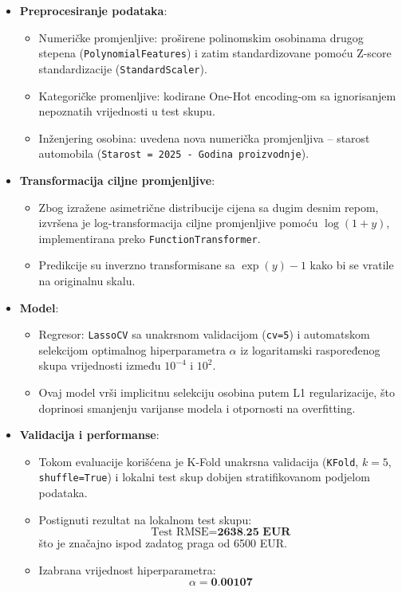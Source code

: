 \documentclass[a4paper,12pt]{article}
\begin{document}
\begin{itemize}
    \item \textbf{Preprocesiranje podataka}:
    \begin{itemize}
        \item Numeričke promjenljive: proširene polinomskim osobinama drugog stepena (\texttt{PolynomialFeatures}) i zatim standardizovane pomoću Z-score standardizacije (\texttt{StandardScaler}).
        \item Kategoričke promenljive: kodirane One-Hot encoding-om sa ignorisanjem nepoznatih vrijednosti u test skupu.
        \item Inženjering osobina: uvedena nova numerička promjenljiva -- starost automobila (\texttt{Starost = 2025 - Godina proizvodnje}).
    \end{itemize}
    
    \item \textbf{Transformacija ciljne promjenljive}:
    \begin{itemize}
        \item Zbog izražene asimetrične distribucije cijena sa dugim desnim repom, izvršena je log-transformacija ciljne promjenljive pomoću $\log(1 + y)$, implementirana preko \texttt{FunctionTransformer}.
        \item Predikcije su inverzno transformisane sa $\exp(y) - 1$ kako bi se vratile na originalnu skalu.
    \end{itemize}
    
    \item \textbf{Model}:
    \begin{itemize}
        \item Regresor: \texttt{LassoCV} sa unakrsnom validacijom (\texttt{cv=5}) i automatskom selekcijom optimalnog hiperparametra $\alpha$ iz logaritamski raspoređenog skupa vrijednosti između $10^{-4}$ i $10^2$.
        \item Ovaj model vrši implicitnu selekciju osobina putem L1 regularizacije, što doprinosi smanjenju varijanse modela i otpornosti na overfitting.
    \end{itemize}
    
    \item \textbf{Validacija i performanse}:
    \begin{itemize}
        \item Tokom evaluacije korišćena je K-Fold unakrsna validacija (\texttt{KFold}, $k=5$, \texttt{shuffle=True}) i lokalni test skup dobijen stratifikovanom podjelom podataka.
        \item Postignuti rezultat na lokalnom test skupu:
        \[
        \text{Test RMSE} = \textbf{2638.25 EUR}
        \]
        što je značajno ispod zadatog praga od 6500 EUR.
        \item Izabrana vrijednost hiperparametra:
        \[
        \alpha = \textbf{0.00107}
        \]
    \end{itemize}
\end{itemize}
\end{document}

